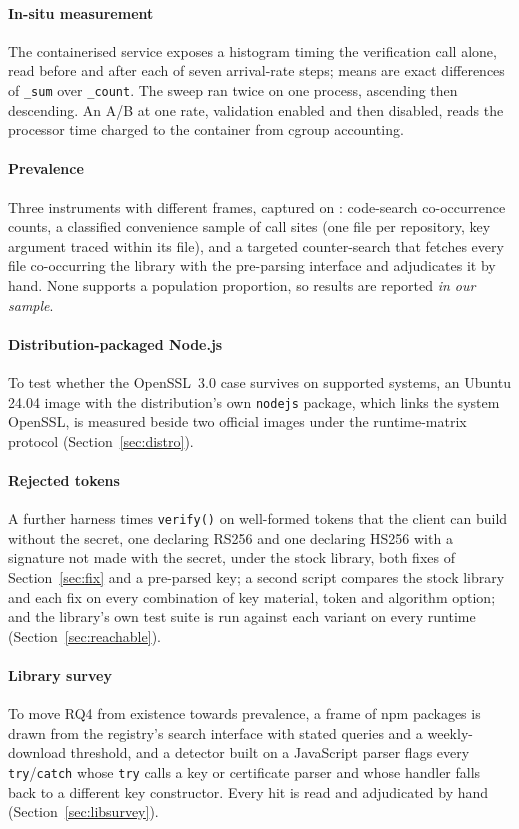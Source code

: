 \documentclass[preprint,12pt,authoryear]{elsarticle}
\begin{document}
\paragraph{In-situ measurement}\label{sec:insitu-method} The containerised
service exposes a histogram timing the verification call alone, read before and
after each of seven arrival-rate steps; means are exact differences of
\texttt{\_sum} over \texttt{\_count}. The sweep ran twice on one process,
ascending then descending. An A/B at one rate, validation enabled and then
disabled, reads the processor time charged to the container from cgroup
accounting.

\paragraph{Prevalence}\label{sec:frames} Three instruments with different
frames, captured on \PopCapturedAt: code-search co-occurrence counts, a
classified convenience sample of call sites (one file per repository, key
argument traced within its file), and a targeted counter-search that fetches
every file co-occurring the library with the pre-parsing interface and
adjudicates it by hand. None supports a population proportion, so results are
reported \emph{in our sample}.

\paragraph{Distribution-packaged Node.js} To test whether the OpenSSL~3.0 case
survives on supported systems, an Ubuntu 24.04 image with the distribution's
own \texttt{nodejs} package, which links the system OpenSSL, is measured beside
two official images under the runtime-matrix protocol (Section~\ref{sec:distro}).

\paragraph{Rejected tokens} A further harness times \texttt{verify()} on
well-formed tokens that the client can build without the secret, one declaring
RS256 and one declaring HS256 with a signature not made with the secret, under
the stock library, both fixes of Section~\ref{sec:fix} and a pre-parsed key;
a second script compares the stock library and each fix on every combination
of key material, token and algorithm option; and the library's own test suite
is run against each variant on every runtime (Section~\ref{sec:reachable}).

\paragraph{Library survey}\label{sec:libsurvey-method} To move RQ4 from
existence towards prevalence, a frame of npm packages is drawn from the
registry's search interface with stated queries and a weekly-download
threshold, and a detector built on a JavaScript parser flags every
\texttt{try}/\texttt{catch} whose \texttt{try} calls a key or certificate
parser and whose handler falls back to a different key constructor. Every hit is
read and adjudicated by hand (Section~\ref{sec:libsurvey}).
\end{document}
